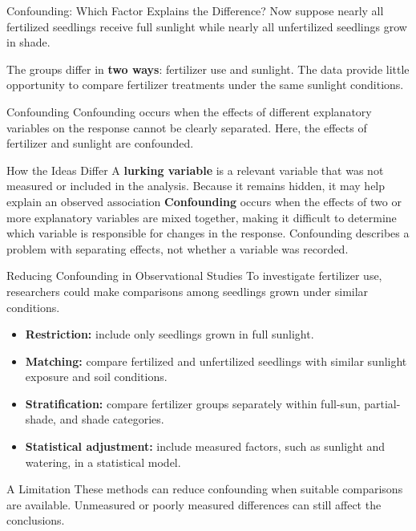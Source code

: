 \documentclass[aspectratio=169]{beamer}
\begin{document}
\begin{frame}{Confounding: Which Factor Explains the Difference?}
Now suppose nearly all fertilized seedlings receive full sunlight while nearly all unfertilized seedlings grow in shade.

The groups differ in \textbf{two ways}: fertilizer use and sunlight.
The data provide little opportunity to compare fertilizer treatments under the same sunlight conditions.

\begin{block}{Confounding}
Confounding occurs when the effects of different explanatory variables on the response cannot be clearly separated. Here, the effects of fertilizer and sunlight are confounded.
\end{block}

\begin{alertblock}{How the Ideas Differ}
A \textbf{lurking variable} is a relevant variable that was not measured or included in the analysis. Because it remains hidden, it may help explain an observed association \textbf{Confounding} occurs when the effects of two or more explanatory variables are mixed together, making it difficult to determine which variable is responsible for changes in the response. Confounding describes a problem with separating effects, not whether a variable was recorded.
\end{alertblock}
\end{frame}

\begin{frame}{Reducing Confounding in Observational Studies}
To investigate fertilizer use, researchers could make comparisons among seedlings grown under similar conditions.

\begin{itemize}
	\item \textbf{Restriction:} include only seedlings grown in full sunlight.
	\item \textbf{Matching:} compare fertilized and unfertilized seedlings with similar sunlight exposure and soil conditions.
	\item \textbf{Stratification:} compare fertilizer groups separately within full-sun, partial-shade, and shade categories.
	\item \textbf{Statistical adjustment:} include measured factors, such as sunlight and watering, in a statistical model.
\end{itemize}

\begin{block}{A Limitation}
These methods can reduce confounding when suitable comparisons are available. Unmeasured or poorly measured differences can still affect the conclusions.
\end{block}
\end{frame}
\end{document}

